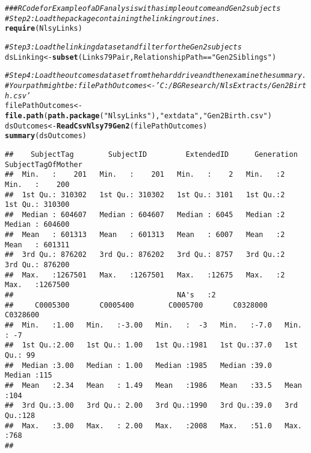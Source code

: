 \documentclass{article}\usepackage[]{graphicx}\usepackage[]{color}
\makeatletter
\newcommand{\hlstr}[1]{\textcolor[rgb]{0.192,0.494,0.8}{#1}}%
\newcommand{\hlcom}[1]{\textcolor[rgb]{0.678,0.584,0.686}{\textit{#1}}}%
\newcommand{\hlopt}[1]{\textcolor[rgb]{0,0,0}{#1}}%
\newcommand{\hlstd}[1]{\textcolor[rgb]{0.345,0.345,0.345}{#1}}%
\newcommand{\hlkwb}[1]{\textcolor[rgb]{0.69,0.353,0.396}{#1}}%
\newcommand{\hlkwd}[1]{\textcolor[rgb]{0.737,0.353,0.396}{\textbf{#1}}}%
\newenvironment{kframe}{%
 \def\at@end@of@kframe{}%
 \ifinner\ifhmode%
  \def\at@end@of@kframe{\end{minipage}}%
  \begin{minipage}{\columnwidth}%
 \fi\fi%
 \def\FrameCommand##1{\hskip\@totalleftmargin \hskip-\fboxsep
 \colorbox{shadecolor}{##1}\hskip-\fboxsep
     \hskip-\linewidth \hskip-\@totalleftmargin \hskip\columnwidth}%
 \MakeFramed {\advance\hsize-\width
   \@totalleftmargin\z@ \linewidth\hsize
   \@setminipage}}%
 {\par\unskip\endMakeFramed%
 \at@end@of@kframe}
\newenvironment{knitrout}{}{} %
\makeatother
\begin{document}
\begin{knitrout}
\color{fgcolor}\begin{kframe}
\begin{alltt}
\hlcom{### R Code for Example of a DF analysis with a simple outcome and Gen2 subjects}
\hlcom{#Step 2: Load the package containing the linking routines.}
\hlkwd{require}\hlstd{(NlsyLinks)}

\hlcom{#Step 3: Load the linking dataset and filter for the Gen2 subjects}
\hlstd{dsLinking} \hlkwb{<-} \hlkwd{subset}\hlstd{(Links79Pair, RelationshipPath}\hlopt{==}\hlstr{"Gen2Siblings"}\hlstd{)}

\hlcom{#Step 4: Load the outcomes dataset from the hard drive and then examine the summary.}
\hlcom{#   Your path might be: filePathOutcomes <- 'C:/BGResearch/NlsExtracts/Gen2Birth.csv'}
\hlstd{filePathOutcomes} \hlkwb{<-} \hlkwd{file.path}\hlstd{(}\hlkwd{path.package}\hlstd{(}\hlstr{"NlsyLinks"}\hlstd{),} \hlstr{"extdata"}\hlstd{,} \hlstr{"Gen2Birth.csv"}\hlstd{)}
\hlstd{dsOutcomes} \hlkwb{<-} \hlkwd{ReadCsvNlsy79Gen2}\hlstd{(filePathOutcomes)}
\hlkwd{summary}\hlstd{(dsOutcomes)}
\end{alltt}
\begin{verbatim}
##    SubjectTag        SubjectID         ExtendedID      Generation SubjectTagOfMother
##  Min.   :    201   Min.   :    201   Min.   :    2   Min.   :2    Min.   :    200   
##  1st Qu.: 310302   1st Qu.: 310302   1st Qu.: 3101   1st Qu.:2    1st Qu.: 310300   
##  Median : 604607   Median : 604607   Median : 6045   Median :2    Median : 604600   
##  Mean   : 601313   Mean   : 601313   Mean   : 6007   Mean   :2    Mean   : 601311   
##  3rd Qu.: 876202   3rd Qu.: 876202   3rd Qu.: 8757   3rd Qu.:2    3rd Qu.: 876200   
##  Max.   :1267501   Max.   :1267501   Max.   :12675   Max.   :2    Max.   :1267500   
##                                      NA's   :2                                      
##     C0005300       C0005400        C0005700       C0328000       C0328600  
##  Min.   :1.00   Min.   :-3.00   Min.   :  -3   Min.   :-7.0   Min.   : -7  
##  1st Qu.:2.00   1st Qu.: 1.00   1st Qu.:1981   1st Qu.:37.0   1st Qu.: 99  
##  Median :3.00   Median : 1.00   Median :1985   Median :39.0   Median :115  
##  Mean   :2.34   Mean   : 1.49   Mean   :1986   Mean   :33.5   Mean   :104  
##  3rd Qu.:3.00   3rd Qu.: 2.00   3rd Qu.:1990   3rd Qu.:39.0   3rd Qu.:128  
##  Max.   :3.00   Max.   : 2.00   Max.   :2008   Max.   :51.0   Max.   :768  
##                                                                            

\end{verbatim}
\end{kframe}
\end{knitrout}
\end{document}
